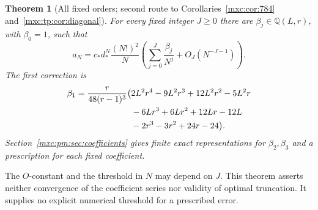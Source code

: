 \documentclass[11pt]{article}
\numberwithin{equation}{section}
\newtheorem{theorem}{Theorem}[section]
\theoremstyle{definition}
\theoremstyle{remark}
\begin{document}
\begin{theorem}[All fixed orders; second route to Corollaries~\ref{mxc:cor:784} and~\ref{mxc:tp:cor:diagonal}]\label{mxc:pm:thm:main}
For every fixed integer $J\ge0$ there are $\beta_j\in\mathbb Q(L,r)$, with
$\beta_0=1$, such that
\begin{equation}\label{mxc:pm:eq:main}
 a_N=c_*d_*^N\frac{(N!)^2}{N}
 \left(\sum_{j=0}^{J}\frac{\beta_j}{N^j}+O_J(N^{-J-1})\right).
\end{equation}
The first correction is
\begin{align}\label{mxc:pm:eq:C1}
 \beta_1=\frac{r}{48(r-1)^3}\bigl(&2L^2r^4-9L^2r^3+12L^2r^2-5L^2r\notag\\
 &-6Lr^3+6Lr^2+12Lr-12L\notag\\
 &-2r^3-3r^2+24r-24\bigr).
\end{align}
Section~\ref{mxc:pm:sec:coefficients} gives finite exact representations for
$\beta_2,\beta_3$ and a prescription for each fixed coefficient.
\end{theorem}
The $O$-constant and the threshold in $N$ may depend on $J$. This theorem
asserts neither convergence of the coefficient series nor validity of
optimal truncation. It supplies no explicit numerical threshold for a
prescribed error.
\end{document}
